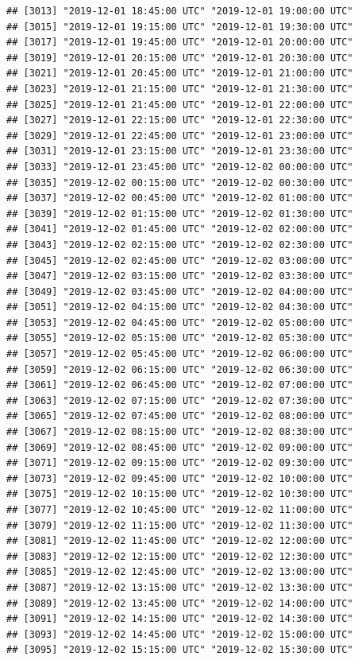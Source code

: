 \documentclass{article}\usepackage[]{graphicx}\usepackage[]{color}
\makeatletter
\newenvironment{kframe}{%
 \def\at@end@of@kframe{}%
 \ifinner\ifhmode%
  \def\at@end@of@kframe{\end{minipage}}%
  \begin{minipage}{\columnwidth}%
 \fi\fi%
 \def\FrameCommand##1{\hskip\@totalleftmargin \hskip-\fboxsep
 \colorbox{shadecolor}{##1}\hskip-\fboxsep
     \hskip-\linewidth \hskip-\@totalleftmargin \hskip\columnwidth}%
 \MakeFramed {\advance\hsize-\width
   \@totalleftmargin\z@ \linewidth\hsize
   \@setminipage}}%
 {\par\unskip\endMakeFramed%
 \at@end@of@kframe}
\newenvironment{knitrout}{}{} %
\makeatother
\begin{document}
\begin{knitrout}
\begin{kframe}
\begin{verbatim}
## [3013] "2019-12-01 18:45:00 UTC" "2019-12-01 19:00:00 UTC"
## [3015] "2019-12-01 19:15:00 UTC" "2019-12-01 19:30:00 UTC"
## [3017] "2019-12-01 19:45:00 UTC" "2019-12-01 20:00:00 UTC"
## [3019] "2019-12-01 20:15:00 UTC" "2019-12-01 20:30:00 UTC"
## [3021] "2019-12-01 20:45:00 UTC" "2019-12-01 21:00:00 UTC"
## [3023] "2019-12-01 21:15:00 UTC" "2019-12-01 21:30:00 UTC"
## [3025] "2019-12-01 21:45:00 UTC" "2019-12-01 22:00:00 UTC"
## [3027] "2019-12-01 22:15:00 UTC" "2019-12-01 22:30:00 UTC"
## [3029] "2019-12-01 22:45:00 UTC" "2019-12-01 23:00:00 UTC"
## [3031] "2019-12-01 23:15:00 UTC" "2019-12-01 23:30:00 UTC"
## [3033] "2019-12-01 23:45:00 UTC" "2019-12-02 00:00:00 UTC"
## [3035] "2019-12-02 00:15:00 UTC" "2019-12-02 00:30:00 UTC"
## [3037] "2019-12-02 00:45:00 UTC" "2019-12-02 01:00:00 UTC"
## [3039] "2019-12-02 01:15:00 UTC" "2019-12-02 01:30:00 UTC"
## [3041] "2019-12-02 01:45:00 UTC" "2019-12-02 02:00:00 UTC"
## [3043] "2019-12-02 02:15:00 UTC" "2019-12-02 02:30:00 UTC"
## [3045] "2019-12-02 02:45:00 UTC" "2019-12-02 03:00:00 UTC"
## [3047] "2019-12-02 03:15:00 UTC" "2019-12-02 03:30:00 UTC"
## [3049] "2019-12-02 03:45:00 UTC" "2019-12-02 04:00:00 UTC"
## [3051] "2019-12-02 04:15:00 UTC" "2019-12-02 04:30:00 UTC"
## [3053] "2019-12-02 04:45:00 UTC" "2019-12-02 05:00:00 UTC"
## [3055] "2019-12-02 05:15:00 UTC" "2019-12-02 05:30:00 UTC"
## [3057] "2019-12-02 05:45:00 UTC" "2019-12-02 06:00:00 UTC"
## [3059] "2019-12-02 06:15:00 UTC" "2019-12-02 06:30:00 UTC"
## [3061] "2019-12-02 06:45:00 UTC" "2019-12-02 07:00:00 UTC"
## [3063] "2019-12-02 07:15:00 UTC" "2019-12-02 07:30:00 UTC"
## [3065] "2019-12-02 07:45:00 UTC" "2019-12-02 08:00:00 UTC"
## [3067] "2019-12-02 08:15:00 UTC" "2019-12-02 08:30:00 UTC"
## [3069] "2019-12-02 08:45:00 UTC" "2019-12-02 09:00:00 UTC"
## [3071] "2019-12-02 09:15:00 UTC" "2019-12-02 09:30:00 UTC"
## [3073] "2019-12-02 09:45:00 UTC" "2019-12-02 10:00:00 UTC"
## [3075] "2019-12-02 10:15:00 UTC" "2019-12-02 10:30:00 UTC"
## [3077] "2019-12-02 10:45:00 UTC" "2019-12-02 11:00:00 UTC"
## [3079] "2019-12-02 11:15:00 UTC" "2019-12-02 11:30:00 UTC"
## [3081] "2019-12-02 11:45:00 UTC" "2019-12-02 12:00:00 UTC"
## [3083] "2019-12-02 12:15:00 UTC" "2019-12-02 12:30:00 UTC"
## [3085] "2019-12-02 12:45:00 UTC" "2019-12-02 13:00:00 UTC"
## [3087] "2019-12-02 13:15:00 UTC" "2019-12-02 13:30:00 UTC"
## [3089] "2019-12-02 13:45:00 UTC" "2019-12-02 14:00:00 UTC"
## [3091] "2019-12-02 14:15:00 UTC" "2019-12-02 14:30:00 UTC"
## [3093] "2019-12-02 14:45:00 UTC" "2019-12-02 15:00:00 UTC"
## [3095] "2019-12-02 15:15:00 UTC" "2019-12-02 15:30:00 UTC"

\end{verbatim}
\end{kframe}
\end{knitrout}
\end{document}
